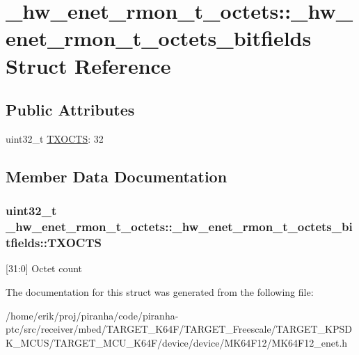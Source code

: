 \hypertarget{struct__hw__enet__rmon__t__octets_1_1__hw__enet__rmon__t__octets__bitfields}{}\section{\+\_\+hw\+\_\+enet\+\_\+rmon\+\_\+t\+\_\+octets\+:\+:\+\_\+hw\+\_\+enet\+\_\+rmon\+\_\+t\+\_\+octets\+\_\+bitfields Struct Reference}
\label{struct__hw__enet__rmon__t__octets_1_1__hw__enet__rmon__t__octets__bitfields}
\subsection*{Public Attributes}
\begin{DoxyCompactItemize}
\item 
uint32\+\_\+t \hyperlink{struct__hw__enet__rmon__t__octets_1_1__hw__enet__rmon__t__octets__bitfields_af5d6a178921a19ea5e1c239eba272c62}{T\+X\+O\+C\+TS}\+: 32
\end{DoxyCompactItemize}


\subsection{Member Data Documentation}
\subsubsection[{\texorpdfstring{T\+X\+O\+C\+TS}{TXOCTS}}]{\setlength{\rightskip}{0pt plus 5cm}uint32\+\_\+t \+\_\+hw\+\_\+enet\+\_\+rmon\+\_\+t\+\_\+octets\+::\+\_\+hw\+\_\+enet\+\_\+rmon\+\_\+t\+\_\+octets\+\_\+bitfields\+::\+T\+X\+O\+C\+TS}\hypertarget{struct__hw__enet__rmon__t__octets_1_1__hw__enet__rmon__t__octets__bitfields_af5d6a178921a19ea5e1c239eba272c62}{}\label{struct__hw__enet__rmon__t__octets_1_1__hw__enet__rmon__t__octets__bitfields_af5d6a178921a19ea5e1c239eba272c62}
\mbox{[}31\+:0\mbox{]} Octet count 

The documentation for this struct was generated from the following file\+:\begin{DoxyCompactItemize}
\item 
/home/erik/proj/piranha/code/piranha-\/ptc/src/receiver/mbed/\+T\+A\+R\+G\+E\+T\+\_\+\+K64\+F/\+T\+A\+R\+G\+E\+T\+\_\+\+Freescale/\+T\+A\+R\+G\+E\+T\+\_\+\+K\+P\+S\+D\+K\+\_\+\+M\+C\+U\+S/\+T\+A\+R\+G\+E\+T\+\_\+\+M\+C\+U\+\_\+\+K64\+F/device/device/\+M\+K64\+F12/M\+K64\+F12\+\_\+enet.\+h\end{DoxyCompactItemize}
